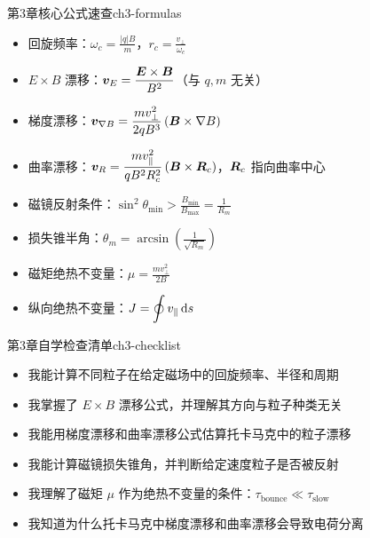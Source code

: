 \begin{formulabox}{第3章核心公式速查}{ch3-formulas}
\begin{itemize}[leftmargin=*,itemsep=0pt]
\item 回旋频率：$\displaystyle\omega_c = \frac{|q|B}{m}$，$\displaystyle r_c = \frac{v_{\perp}}{\omega_c}$
\item $E\times B$ 漂移：$\displaystyle\bm{v}_E = \frac{\bm{E}\times\bm{B}}{B^2}$（与 $q,m$ 无关）
\item 梯度漂移：$\displaystyle\bm{v}_{\nabla B} = \frac{m v_{\perp}^2}{2qB^3}\,(\bm{B}\times\nabla B)$
\item 曲率漂移：$\displaystyle\bm{v}_R = \frac{m v_{\parallel}^2}{qB^2R_c^2}\,(\bm{B}\times\bm{R}_c)$，$\bm{R}_c$ 指向曲率中心
\item 磁镜反射条件：$\displaystyle\sin^2\theta_{\min} > \frac{B_{\min}}{B_{\max}} = \frac{1}{R_m}$
\item 损失锥半角：$\displaystyle\theta_m = \arcsin\!\left(\frac{1}{\sqrt{R_m}}\right)$
\item 磁矩绝热不变量：$\displaystyle\mu = \frac{m v_{\perp}^2}{2B}$
\item 纵向绝热不变量：$\displaystyle J = \oint v_{\parallel}\,\mathrm{d} s$
\end{itemize}
\end{formulabox}

\begin{checklistbox}{第3章自学检查清单}{ch3-checklist}
\begin{itemize}[leftmargin=*,label=$\square$]
\item 我能计算不同粒子在给定磁场中的回旋频率、半径和周期
\item 我掌握了 $E\times B$ 漂移公式，并理解其方向与粒子种类无关
\item 我能用梯度漂移和曲率漂移公式估算托卡马克中的粒子漂移
\item 我能计算磁镜损失锥角，并判断给定速度粒子是否被反射
\item 我理解了磁矩 $\mu$ 作为绝热不变量的条件：$\tau_{\text{bounce}}\ll\tau_{\text{slow}}$
\item 我知道为什么托卡马克中梯度漂移和曲率漂移会导致电荷分离
\end{itemize}
\end{checklistbox}

\endinput
